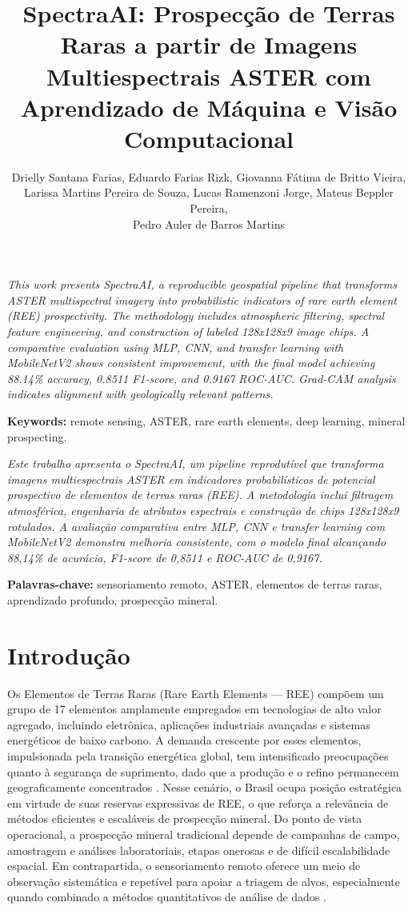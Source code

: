 \documentclass[12pt,twocolumn]{article}
\title{SpectraAI: Prospecção de Terras Raras a partir de Imagens Multiespectrais ASTER com Aprendizado de Máquina e Visão Computacional}
\author{
Drielly Santana Farias\inst{1},
Eduardo Farias Rizk\inst{1},
Giovanna Fátima de Britto Vieira\inst{1},\\
Larissa Martins Pereira de Souza\inst{1},
Lucas Ramenzoni Jorge\inst{1},
Mateus Beppler Pereira\inst{1},\\
Pedro Auler de Barros Martins\inst{1}
}
\makeatletter
\renewenvironment{abstract}{%
      \list{}{\advance\topsep by6pt\relax
      \leftmargin=0cm
      \labelwidth=\z@
      \listparindent=\z@
      \itemindent\listparindent
      \rightmargin\leftmargin}\item[\hskip\labelsep
                                    \bfseries\itshape Abstract.]\itshape}%
      {\endlist}
\renewenvironment{resumo}{%
      \list{}{\advance\topsep by6pt\relax
      \leftmargin=0cm
      \labelwidth=\z@
      \listparindent=\z@
      \itemindent\listparindent
      \rightmargin\leftmargin}\item[\hskip\labelsep
                                    \bfseries\itshape Resumo.]\itshape}%
      {\endlist}
\renewcommand{\maketitle}{%
  \twocolumn[%
    \begin{center}
    \vspace*{-0.7cm}
    {\fontsize{16}{20}\selectfont\bfseries\@title\par}
    \vskip 6pt plus 3pt minus 3pt
    {\normalsize\textbf{\begin{tabular}[t]{c}\@author\end{tabular}}\par}
    \vskip 6pt plus 3pt minus 3pt
    {\normalsize\begin{tabular}[t]{c}\inst{\instnum}\@address\end{tabular}\par}
    \end{center}
    \vskip 0.3cm
  ]%
}
\makeatother
\begin{document}
\maketitle

\begin{abstract}
This work presents SpectraAI, a reproducible geospatial pipeline that transforms ASTER multispectral imagery into probabilistic indicators of rare earth element (REE) prospectivity. The methodology includes atmospheric filtering, spectral feature engineering, and construction of labeled 128x128x9 image chips. A comparative evaluation using MLP, CNN, and transfer learning with MobileNetV2 shows consistent improvement, with the final model achieving 88.14\% accuracy, 0.8511 F1-score, and 0.9167 ROC-AUC. Grad-CAM analysis indicates alignment with geologically relevant patterns.

\noindent \textbf{Keywords:} remote sensing, ASTER, rare earth elements, deep learning, mineral prospecting.
\end{abstract}

\begin{resumo}
Este trabalho apresenta o SpectraAI, um pipeline reprodutível que transforma imagens multiespectrais ASTER em indicadores probabilísticos de potencial prospectivo de elementos de terras raras (REE). A metodologia inclui filtragem atmosférica, engenharia de atributos espectrais e construção de chips 128x128x9 rotulados. A avaliação comparativa entre MLP, CNN e transfer learning com MobileNetV2 demonstra melhoria consistente, com o modelo final alcançando 88,14\% de acurácia, F1-score de 0,8511 e ROC-AUC de 0,9167.

\noindent \textbf{Palavras-chave:} sensoriamento remoto, ASTER, elementos de terras raras, aprendizado profundo, prospecção mineral.
\end{resumo}

\section{Introdução}\label{introduuxe7uxe3o}

Os Elementos de Terras Raras (Rare Earth Elements --- REE) compõem um grupo de 17 elementos amplamente empregados em tecnologias de alto valor agregado, incluindo eletrônica, aplicações industriais avançadas e sistemas energéticos de baixo carbono. A demanda crescente por esses elementos, impulsionada pela transição energética global, tem intensificado preocupações quanto à segurança de suprimento, dado que a produção e o refino permanecem geograficamente concentrados \cite{iea2021, usgs2025}. Nesse cenário, o Brasil ocupa posição estratégica em virtude de suas reservas expressivas de REE, o que reforça a relevância de métodos eficientes e escaláveis de prospecção mineral. Do ponto de vista operacional, a prospecção mineral tradicional depende de campanhas de campo, amostragem e análises laboratoriais, etapas onerosas e de difícil escalabilidade espacial. Em contrapartida, o sensoriamento remoto oferece um meio de observação sistemática e repetível para apoiar a triagem de alvos, especialmente quando combinado a métodos quantitativos de análise de dados \cite{sabins1999, vandermeer2012}.
\end{document}
